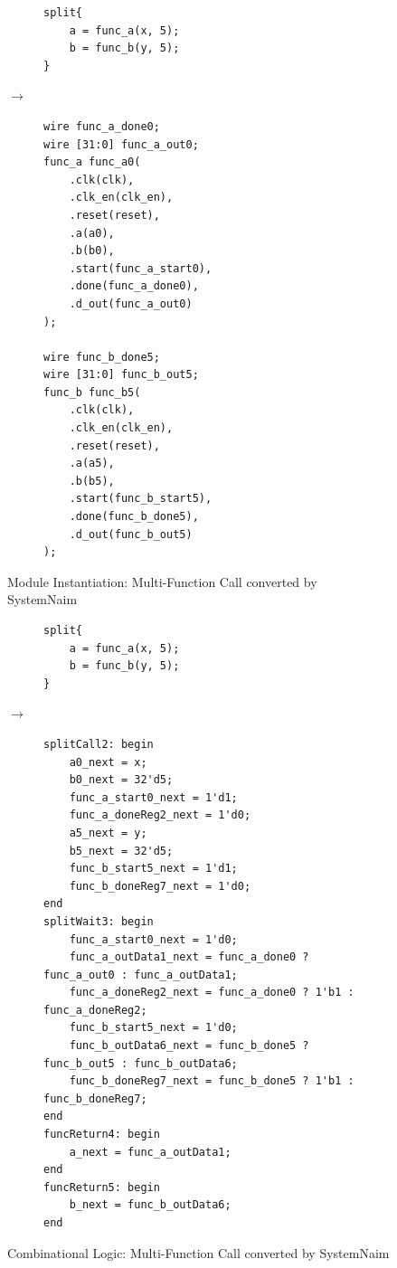 \begin{figure}[H]
\centering
\begin{subfigure}{0.32\textwidth}
    \centering
    \begin{verbatim}
split{
    a = func_a(x, 5);
    b = func_b(y, 5);
}
\end{verbatim}
\end{subfigure}%
{\LARGE$\rightarrow$}%
\begin{subfigure}{0.45\textwidth}
    \begin{verbatim}
wire func_a_done0;
wire [31:0] func_a_out0;
func_a func_a0(
    .clk(clk),
    .clk_en(clk_en),
    .reset(reset),
    .a(a0),
    .b(b0),
    .start(func_a_start0),
    .done(func_a_done0),
    .d_out(func_a_out0)
);

wire func_b_done5;
wire [31:0] func_b_out5;
func_b func_b5(
    .clk(clk),
    .clk_en(clk_en),
    .reset(reset),
    .a(a5),
    .b(b5),
    .start(func_b_start5),
    .done(func_b_done5),
    .d_out(func_b_out5)
);
    \end{verbatim}
\end{subfigure}
\caption{Module Instantiation: Multi-Function Call converted by SystemNaim}
\label{sn:multi_func_call_mdl}
\end{figure}


\begin{figure}[H]
\centering
\begin{subfigure}{0.32\textwidth}
    \centering
    \begin{verbatim}
split{
    a = func_a(x, 5);
    b = func_b(y, 5);
}
\end{verbatim}
\end{subfigure}%
{\LARGE$\rightarrow$}%
\begin{subfigure}{0.58\textwidth}
    \begin{verbatim}
splitCall2: begin
    a0_next = x;
    b0_next = 32'd5;
    func_a_start0_next = 1'd1;
    func_a_doneReg2_next = 1'd0;
    a5_next = y;
    b5_next = 32'd5;
    func_b_start5_next = 1'd1;
    func_b_doneReg7_next = 1'd0;
end
splitWait3: begin
    func_a_start0_next = 1'd0;
    func_a_outData1_next = func_a_done0 ? func_a_out0 : func_a_outData1;
    func_a_doneReg2_next = func_a_done0 ? 1'b1 : func_a_doneReg2;
    func_b_start5_next = 1'd0;
    func_b_outData6_next = func_b_done5 ? func_b_out5 : func_b_outData6;
    func_b_doneReg7_next = func_b_done5 ? 1'b1 : func_b_doneReg7;
end
funcReturn4: begin
    a_next = func_a_outData1;
end
funcReturn5: begin
    b_next = func_b_outData6;
end
    \end{verbatim}
\end{subfigure}
\caption{Combinational Logic: Multi-Function Call converted by SystemNaim}
\label{sn:multi_func_call_comb}
\end{figure}

